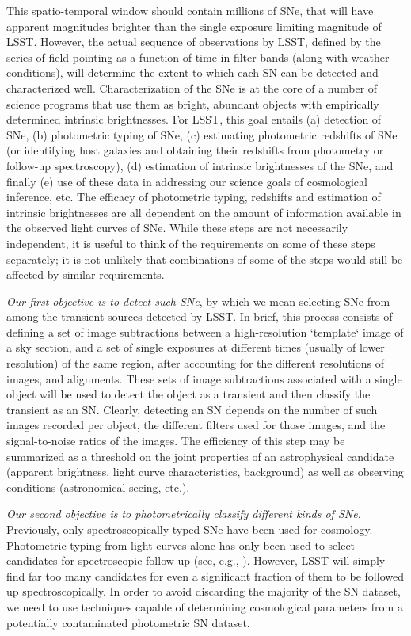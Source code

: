 This spatio-temporal window should contain millions
of SNe, that will have apparent magnitudes brighter than the single
exposure limiting magnitude of LSST.  However, the actual sequence of
observations by LSST, defined by the series of field pointing as a
function of time in filter bands (along with weather conditions), will
determine the extent to which each SN can be detected and characterized
well.  Characterization of the SNe is at the core of a number of science
programs that use them as bright, abundant objects with empirically
determined intrinsic brightnesses. For LSST, this goal entails (a)
detection of SNe, (b) photometric typing of SNe, (c) estimating photometric
redshifts of SNe (or identifying host galaxies and obtaining their
redshifts from photometry or follow-up spectroscopy), (d) estimation of
intrinsic brightnesses of the SNe, and finally (e) use of these data in
addressing our science goals of cosmological inference, etc. The efficacy
of photometric typing, redshifts and estimation of intrinsic brightnesses
are all dependent on the amount of information available in the observed
light curves of SNe. While these steps are not necessarily independent, it
is useful to think of the requirements on some of these steps separately;
it is not unlikely  that combinations of some of the steps would still be
affected by similar requirements.

{\emph{Our first objective is to detect such SNe}}, by which we mean
selecting SNe from among the transient sources detected by LSST.
In brief, this process consists of defining a set of image subtractions
between a high-resolution `template` image of a sky section, and a set of
single exposures at different times (usually of lower resolution) of the
same region, after accounting for the different resolutions of images, and
alignments. These sets of image subtractions associated with a single
object will be used to detect the object as a transient and then classify
the transient as an SN. Clearly, detecting an SN depends on the number of
such images recorded per object, the different filters used for those
images, and the signal-to-noise ratios of the images. %
The efficiency of this step may be summarized as a threshold on the
joint properties of an astrophysical candidate (apparent brightness, light
curve characteristics, background) as well as observing conditions
(astronomical seeing, etc.).

{\emph{Our second objective is to photometrically classify different kinds of SNe.}}
Previously, only spectroscopically typed SNe have been used for cosmology. Photometric
typing from light curves alone has only been used to select candidates for spectroscopic
follow-up (see, e.g., \citet{Sako2008}). However, LSST will simply find far too many
candidates for even a significant fraction of them to be followed up spectroscopically. In order to avoid
discarding the majority of the SN dataset, we need to use techniques capable of
determining cosmological parameters from a potentially contaminated photometric SN dataset.

